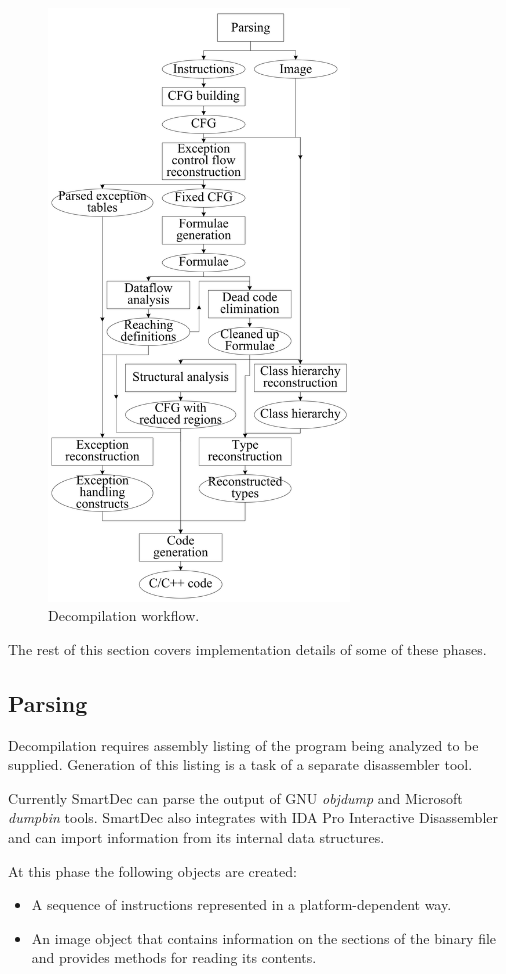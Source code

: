 \documentclass[10pt, conference, compsocconf]{IEEEtran}
\newcommand{\compact}{}
\newcommand{\skipspace}{}
\newcommand{\skipsectionspace}{}
\begin{document}
\begin{figure}[tb!]
\centering
  \includegraphics[width=8.0cm]{images/workflow}
\caption{Decompilation workflow.}
\label{fig:workflow}
\end{figure}

The rest of this section covers implementation details of some of these phases.

\subsection{Parsing}\skipsectionspace
Decompilation requires assembly listing of the program being analyzed to be supplied.
Generation of this listing is a task of a separate disassembler tool.

Currently SmartDec can parse the output of GNU \emph{objdump}
and Microsoft \emph{dumpbin} tools. 
SmartDec also integrates with IDA Pro Interactive Disassembler 
and can import information from its internal data structures.

At this phase the following objects are created:
\skipspace\begin{itemize}\compact
\item A sequence of instructions represented in a platform-dependent way.
\item An image object that contains information on the sections of the
  binary file and provides methods for reading its contents.
\end{itemize}
\end{document}
